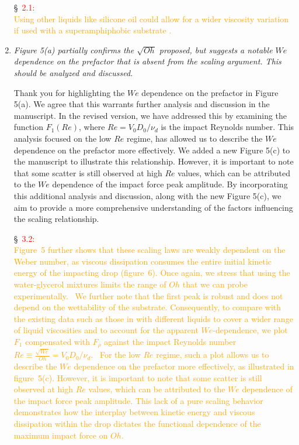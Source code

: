 \documentclass[]{article}
\newcommand*\red{\textcolor{red}}
\newcommand{\VS}[1]{{\textcolor{orange}{#1}}}
\begin{document}
\begin{enumerate}
	\S~\red{2.1:}\\
	\VS{Using other liquids like silicone oil could allow for a wider viscosity variation if used with a superamphiphobic substrate \citep{deng2012candle}.}
	
	\item \textit{Figure 5(a) partially confirms the $\sqrt{Oh}$ proposed, but suggests a notable $We$ dependence on the prefactor that is absent from the scaling argument. This should be analyzed and discussed.}
	
	Thank you for highlighting the $We$ dependence on the prefactor in Figure 5(a). We agree that this warrants further analysis and discussion in the manuscript.
	In the revised version, we have addressed this by examining the function $F_1(Re)$, where $Re = V_0D_0/\nu_d$ is the impact Reynolds number. This analysis focused on the low $Re$ regime, has allowed us to describe the $We$ dependence on the prefactor more effectively.
	We added a new Figure 5(c) to the manuscript to illustrate this relationship. However, it is important to note that some scatter is still observed at high $Re$ values, which can be attributed to the $We$ dependence of the impact force peak amplitude.
	By incorporating this additional analysis and discussion, along with the new Figure 5(c), we aim to provide a more comprehensive understanding of the factors influencing the scaling relationship.
	
	\S~\red{3.2:}\\
	\VS{Figure~5 further shows that these scaling laws are weakly dependent on the Weber number, as viscous dissipation consumes the entire initial kinetic energy of the impacting drop (figure~6). Once again, we stress that using the water-glycerol mixtures limits the range of $Oh$ that we can probe experimentally. 
	We further note that the first peak is robust and does not depend on the wettability of the substrate. Consequently, to compare with the existing data such as those in \citet{cheng2021drop} with different liquids to cover a wider range of liquid viscosities and to account for the apparent $We$-dependence, we plot $F_1$ compensated with $F_\rho$ against the impact Reynolds number $Re \equiv \frac{\sqrt{We}}{Oh} = V_0D_0/\nu_d$. 
	For the low $Re$ regime, such a plot allows us to describe the $We$ dependence on the prefactor more effectively, as illustrated in figure~5(c). However, it is important to note that some scatter is still observed at high $Re$ values, which can be attributed to the $We$ dependence of the impact force peak amplitude. This lack of a pure scaling behavior demonstrates how the interplay between kinetic energy and viscous dissipation within the drop dictates the functional dependence of the maximum impact force on $Oh$.}
	

\end{enumerate}
\end{document}
